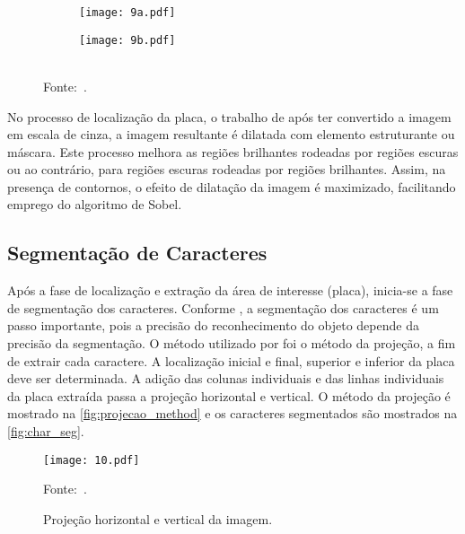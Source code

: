 \begin{figure}[htb]
	\centering
	\caption[\footnotesize Aplicação do Algoritmo de Sobel.]{\footnotesize Aplicação do algoritmo de Sobel. a) Imagem limiarizada por Sobel; e b) Remoção de \emph{pixels}.}   %
	\begin{subfigure}{.4\textwidth}
		\centering
		\label{fig:sobel_a}
		\texttt{[image: 9a.pdf]}
		\caption{ }
	\end{subfigure}
	\begin{subfigure}{.4\textwidth}
		\centering
		\label{fig:sobel_b}
		\texttt{[image: 9b.pdf]}
		\caption{ }
	\end{subfigure}
	\\
	\label{fig:sobel}
	{\footnotesize Fonte:~.}
\end{figure}

No processo de localização da placa, o trabalho de \cite{saleem2016,sen2014,ha2016} após ter convertido a imagem em escala de cinza, a imagem resultante é dilatada com elemento estruturante ou máscara. Este processo melhora as regiões brilhantes rodeadas por regiões escuras ou ao contrário, para regiões escuras rodeadas por regiões brilhantes. Assim, na presença de contornos, o efeito de dilatação da imagem é maximizado, facilitando emprego do algoritmo de Sobel.

\subsection{\textbf{Segmentação de Caracteres}} 

Após a fase de localização e extração da área de interesse (placa), inicia-se a fase de segmentação dos caracteres. Conforme \cite{george2016}, a segmentação dos caracteres é um passo importante, pois a precisão do reconhecimento do objeto depende da precisão da segmentação. O método utilizado por  foi o método da projeção, a fim de extrair cada caractere. A localização inicial e final, superior e inferior da placa deve ser determinada. A adição das colunas individuais e das linhas individuais da placa extraída passa a projeção horizontal e vertical. O método da projeção é mostrado na \autoref{fig:projecao_method} e os caracteres segmentados são mostrados na \autoref{fig:char_seg}.

\begin{figure}[htb]
	\centering
	\caption{{\footnotesize Projeção horizontal e vertical da imagem.}}   %
	\label{fig:projecao_method}
	\texttt{[image: 10.pdf]}
	
	{\footnotesize Fonte:~.}
\end{figure}

